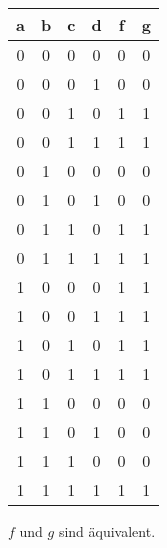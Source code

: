 \documentclass{CInf_practice}
\begin{document}

\begin{center}
  \begin{tabular}{cccc|c|c}
    \bf a & \bf b & \bf c & \bf d & \bf f & \bf g \\ \hline
    0 & 0 & 0 & 0 & 0 & 0 \\
    0 & 0 & 0 & 1 & 0 & 0 \\
    0 & 0 & 1 & 0 & 1 & 1 \\
    0 & 0 & 1 & 1 & 1 & 1 \\
    0 & 1 & 0 & 0 & 0 & 0 \\
    0 & 1 & 0 & 1 & 0 & 0 \\
    0 & 1 & 1 & 0 & 1 & 1 \\
    0 & 1 & 1 & 1 & 1 & 1 \\
    1 & 0 & 0 & 0 & 1 & 1 \\
    1 & 0 & 0 & 1 & 1 & 1 \\
    1 & 0 & 1 & 0 & 1 & 1 \\
    1 & 0 & 1 & 1 & 1 & 1 \\
    1 & 1 & 0 & 0 & 0 & 0 \\
    1 & 1 & 0 & 1 & 0 & 0 \\
    1 & 1 & 1 & 0 & 0 & 0 \\
    1 & 1 & 1 & 1 & 1 & 1 
  \end{tabular}
\end{center}

$f$ und $g$ sind äquivalent.
\end{document}
